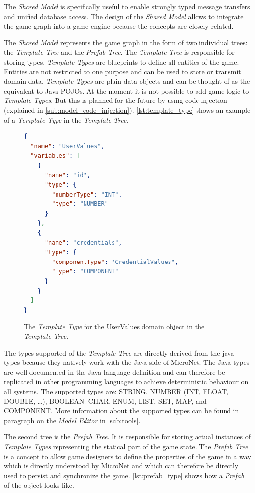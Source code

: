 The \textit{Shared Model} is specifically useful to enable strongly typed
message transfers and unified database access. The design of the \textit{Shared
Model} allows to integrate the game graph into a game engine because the
concepts are closely related.

The \textit{Shared Model} represents the game graph in the form of two
individual trees: the \textit{Template Tree} and the \textit{Prefab Tree}. The
\textit{Template Tree} is responsible for storing types. \textit{Template Types}
are blueprints to define all entities of the game. Entities are not restricted
to one purpose and can be used to store or transmit domain data.
\textit{Template Types} are plain data objects and can be thought of as the
equivalent to Java POJOs. At the moment it is not possible to add game logic to
\textit{Template Types}. But this is planned for the future by using code
injection (explained in \autoref{sub:model_code_injection}).
\autoref{lst:template_type} shows an example of a \textit{Template Type} in the
\textit{Template Tree}.

\begin{figure}
\begin{lstlisting}[language=json,firstnumber=1] 
{
  "name": "UserValues",
  "variables": [
    {
      "name": "id",
      "type": {
        "numberType": "INT",
        "type": "NUMBER"
      }
    },
    {
      "name": "credentials",
      "type": {
        "componentType": "CredentialValues",
        "type": "COMPONENT"
      }
    }
  ]
}
\end{lstlisting}
\caption{The \textit{Template Type} for the UserValues domain object in the \textit{Template Tree}.}
\label{lst:template_type}
\end{figure}

The types supported of the \textit{Template Tree} are directly derived from the
java types because they natively work with the Java side of MicroNet. The Java
types are well documented in the Java language definition and can therefore be
replicated in other programming languages to achieve deterministic behaviour on
all systems.
The supported types are: STRING, NUMBER (INT, FLOAT, DOUBLE, \ldots), BOOLEAN,
CHAR, ENUM, LIST, SET, MAP, and COMPONENT. More information about the supported
types can be found in paragraph on the \textit{Model Editor} in
\autoref{sub:tools}.

The second tree is the \textit{Prefab Tree}. It is responsible for storing
actual instances of \textit{Template Types} representing the statical part of the game
state. The \textit{Prefab Tree} is a concept to allow game designers to define the
properties of the game in a way which is directly understood by MicroNet and
which can therefore be directly used to persist and synchronize the game.
\autoref{lst:prefab_type} shows how a \textit{Prefab} of the 
object looks like.


